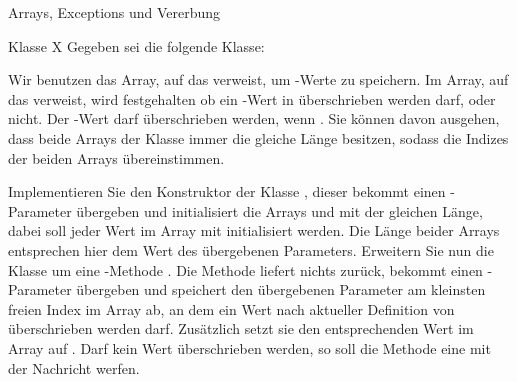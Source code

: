 \documentclass{../tuda-exercise}
\begin{document}
  \begin{task}[credit=\stars{3}{3}]{Arrays, Exceptions und Vererbung}
    \begin{subtask*}{Klasse X}
      \label{task:12.1}
      Gegeben sei die folgende Klasse:

      

      Wir benutzen das Array, auf das  verweist, um -Werte zu
      speichern. Im Array, auf das  verweist, wird festgehalten ob ein
      -Wert in  überschrieben werden darf, oder nicht. Der
      -Wert  darf überschrieben werden, wenn
      . Sie können davon ausgehen, dass beide Arrays der Klasse
       immer die gleiche Länge besitzen, sodass die Indizes der beiden Arrays
      übereinstimmen.

      \br

      Implementieren Sie den Konstruktor der Klasse , dieser bekommt einen
      -Parameter übergeben und initialisiert die Arrays  und
       mit der gleichen Länge, dabei soll jeder Wert im Array
       mit  initialisiert werden. Die Länge beider Arrays
      entsprechen hier dem Wert des übergebenen Parameters. Erweitern Sie nun die Klasse um eine
      -Methode . Die Methode liefert nichts zurück, bekommt
      einen -Parameter übergeben und speichert den übergebenen Parameter am
      kleinsten freien Index im Array  ab, an dem ein Wert nach aktueller
      Definition von  überschrieben werden darf. Zusätzlich setzt sie den
      entsprechenden Wert im Array  auf . Darf kein Wert
      überschrieben werden, so soll die Methode eine  mit der
      Nachricht \code{\textcolor{stringcolor}{"'no free space left"'}} werfen.

      \clearpagesolution

      \begin{solution}
        
      \end{solution}
    \end{subtask*}

    \clearpagesolution


\end{task}
\end{document}
